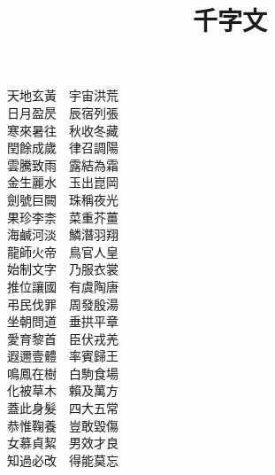 \documentclass[12pt]{article}
\title{千字文}
\begin{document}
\maketitle

\begin{center}
\begin{large}
天地玄黃　宇宙洪荒\\
日月盈昃　辰宿列張\\
寒來暑往　秋收冬藏\\
閏餘成歲　律召調陽\\
雲騰致雨　露結為霜\\
金生麗水　玉出崑岡\\
劍號巨闕　珠稱夜光\\
果珍李柰　菜重芥薑\\
海鹹河淡　鱗潛羽翔\\
龍師火帝　鳥官人皇\\
始制文字　乃服衣裳\\
推位讓國　有虞陶唐\\
弔民伐罪　周發殷湯\\
坐朝問道　垂拱平章\\
愛育黎首　臣伏戎羌\\
遐邇壹體　率賓歸王\\
鳴鳳在樹　白駒食場\\
化被草木　賴及萬方\\
蓋此身髮　四大五常\\
恭惟鞠養　豈敢毀傷\\
女慕貞絜　男效才良\\
知過必改　得能莫忘
\end{large}
\end{center}
\end{document}
